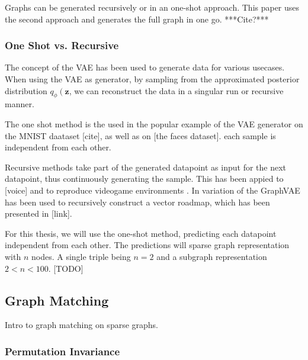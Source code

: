 



Graphs can be generated recursively or in an one-shot approach. This paper uses the second approach and generates the full graph in one go. ***Cite?***

\subsubsection{One Shot vs. Recursive}
The concept of the VAE has been used to generate data for various usecases. When using the VAE as generator, by sampling from the approximated posterior distribution $q_{\phi}\left(\mathbf{z}$, we can reconstruct the data in a singular run or recursive manner.

The one shot method is the used in the popular example of the VAE generator on the MNIST daataset [cite], as well as on [the faces dataset]. each sample is independent from each other.

Recursive methods take part of the generated datapoint as input for the next datapoint, thus continuously generating the sample. This has been appied to [voice] and to reproduce videogame environments \cite{ha_world_2018}. In \cite{belli_image-conditioned_2019} variation of the GraphVAE has been used to recursively construct a vector roadmap, which has been presented in [link].

For this thesis, we will use the one-shot method, predicting each datapoint independent from each other. The predictions will sparse graph representation with $n$ nodes. A single triple being $n=2$ and a subgraph representation $2<n<100$. [TODO]


\subsection{Graph Matching}
Intro to graph matching on sparse graphs.

\subsubsection{Permutation Invariance}


